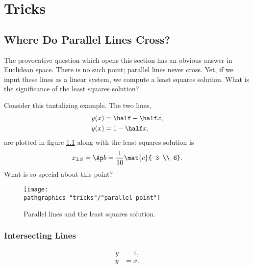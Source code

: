 \chapter{Tricks}

\section{Where Do Parallel Lines Cross?}  %
The provocative question which opens this section has an obvious answer in Euclidean space. There is no such point; parallel lines never cross. Yet, if we input these lines as a linear system, we compute a least squares solution. What is the significance of the least squares solution?

Consider this tantalizing example. The two lines,
  \begin{equation*}   %
    \begin{split}
      y(x) &= \half - \half x, \\
      y(x) &= 1 - \half x,
    \end{split}
  \end{equation*}
are plotted in figure \ref{fig:tantalizing} along with the least squares solution is 
  \begin{equation*}   %
      x_{LS} = \Ap b = \frac{1}{10}\mat{c}{ 3 \\ 6}.
  \end{equation*}
What is so special about this point?
\begin{figure}[htbp] %
   \centering
     \texttt{[image: \\pathgraphics "tricks"/"parallel point"]} 
   \caption{Parallel lines and the least squares solution.}
   \label{fig:tantalizing}
\end{figure}

\subsection{Intersecting Lines}
  \begin{equation*}   %
   \begin{split}
      y &= 1, \\
      y &= x .
   \end{split}
  \end{equation*}

